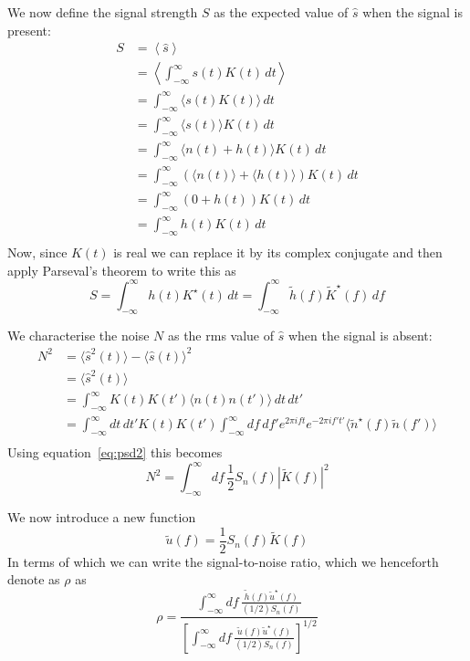 We now define the signal strength $S$ as the expected value of
$\hat{s}$ when the signal is present:
%
\begin{align*}
S &= \left\langle \hat{s} \right\rangle \\
&= \left\langle  \int_{-\infty}^\infty s(t) K(t)\, dt \right\rangle \\
&= \int_{-\infty}^\infty \langle s(t) K(t)\rangle \, dt \\
&= \int_{-\infty}^\infty \langle s(t) \rangle K(t) \, dt \\
&= \int_{-\infty}^\infty \langle n(t) + h(t) \rangle K(t) \, dt \\
&= \int_{-\infty}^\infty \left( \langle n(t) \rangle + \langle h(t)
\rangle \right)  K(t) \, dt \\
&= \int_{-\infty}^\infty \left( 0 + h(t) \right)  K(t) \, dt \\
&= \int_{-\infty}^\infty h(t) K(t) \, dt \\
\end{align*}
%
Now, since $K(t)$ is real we can replace it by its complex conjugate
and then apply Parseval's theorem to write this as
%
\begin{equation*}
S = \int_{-\infty}^\infty h(t) K^\star(t) \, dt
= \int_{-\infty}^\infty \tilde{h}(f) \tilde{K}^\star(f) \, df
\end{equation*}

We characterise the noise $N$ as the rms value of $\hat{s}$ when the
signal is absent:
%
\begin{align}
N^2 &= \langle \hat{s}^2(t) \rangle - \langle \hat{s}(t) \rangle^2 \\
&= \langle \hat{s}^2(t) \rangle  \\
&= \int_{-\infty}^\infty K(t) K(t') \langle n(t) n(t')
\rangle\,dt\,dt' \\
&= \int_{-\infty}^\infty dt\,dt' K(t) K(t') 
\int_{-\infty}^\infty df\,df' e^{2\pi i f t}e^{-2\pi i f' t'} \langle
\tilde{n}^\star(f) \tilde{n}(f')\rangle \\
\end{align}
%
Using equation~\ref{eq:psd2} this becomes
%
\begin{equation}
N^2 = \int_{-\infty}^\infty df\,\frac{1}{2} S_n(f) |\tilde{K}(f)|^2
\end{equation}

We now introduce a new function
%
\begin{equation}
\tilde{u}(f) = \frac{1}{2} S_n(f) \tilde{K}(f)
\end{equation}
%
In terms of which we can write the signal-to-noise ratio, which we
henceforth denote as $\rho$ as
%
\begin{equation}
\rho =
\frac
  {\int_{-\infty}^\infty df\,
   \frac
     {\tilde{h}(f) \tilde{u}^\star(f)}
     {(1/2) S_n(f)}}
  {\left[\int_{-\infty}^\infty df\,
   \frac
     {\tilde{u}(f) \tilde{u}^\star(f)}
     {(1/2) S_n(f)}\right]^{1/2}}
\end{equation}

